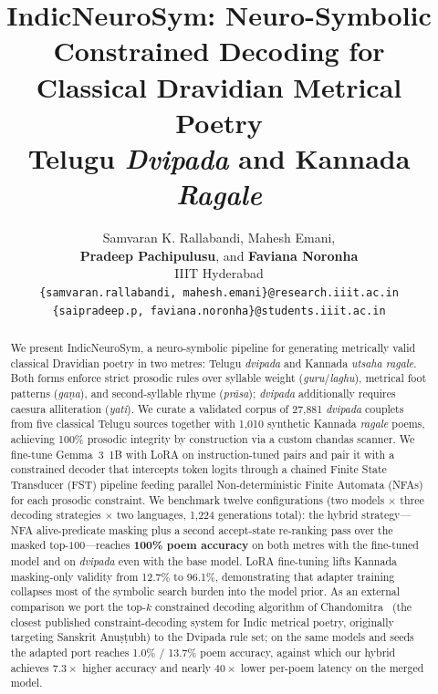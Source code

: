 \documentclass[11pt]{article}
\title{IndicNeuroSym: Neuro-Symbolic Constrained Decoding for\\
       Classical Dravidian Metrical Poetry\\
       \large Telugu \textit{Dvipada} and Kannada \textit{Ragale}}
\author{
  Samvaran K. Rallabandi, Mahesh Emani, \\ 
  {\bf Pradeep Pachipulusu}, and {\bf Faviana Noronha} \\
  IIIT Hyderabad \\
  \texttt{\small \{samvaran.rallabandi, mahesh.emani\}@research.iiit.ac.in} \\
  \texttt{\small \{saipradeep.p, faviana.noronha\}@students.iiit.ac.in} \\
}
\begin{document}
\maketitle

\begin{abstract}
We present IndicNeuroSym, a neuro-symbolic pipeline for generating
metrically valid classical Dravidian poetry in two metres: Telugu
\textit{dvipada} and Kannada \textit{utsaha ragale}. Both forms enforce
strict prosodic rules over syllable weight (\textit{guru}/\textit{laghu}),
metrical foot patterns (\textit{ga\d{n}a}), and second-syllable rhyme
(\textit{pr\={a}sa}); \textit{dvipada} additionally requires caesura
alliteration (\textit{yati}). We curate a validated corpus of 27,881
\textit{dvipada} couplets from five classical Telugu sources together with
1,010 synthetic Kannada \textit{ragale} poems, achieving 100\% prosodic
integrity by construction via a custom chandas scanner. We fine-tune
Gemma~3~1B with LoRA on instruction-tuned pairs and pair it with a
constrained decoder that intercepts token logits through a chained
Finite State Transducer (FST) pipeline feeding parallel Non-deterministic
Finite Automata (NFAs) for each prosodic constraint. We benchmark twelve
configurations (two models $\times$ three decoding strategies $\times$ two
languages, 1{,}224 generations total): the hybrid strategy---NFA
alive-predicate masking plus a second accept-state re-ranking pass over
the masked top-$100$---reaches \textbf{100\% poem accuracy} on both
metres with the fine-tuned model and on \textit{dvipada} even with the
base model.
LoRA fine-tuning lifts Kannada masking-only validity from 12.7\% to
96.1\%, demonstrating that adapter training collapses most of the
symbolic search burden into the model prior. As an external comparison we port the
top-$k$ constrained decoding algorithm of
Chandomitra~\citep{jagadeeshan2026chandomitra} (the closest published
constraint-decoding system for Indic metrical poetry, originally targeting
Sanskrit Anu\d{s}\d{t}ubh) to the Dvipada rule set; on the same models
and seeds the adapted port reaches 1.0\% / 13.7\% poem accuracy, against
which our hybrid achieves $7.3\times$ higher accuracy and nearly
$40\times$ lower per-poem latency on the merged model.
\end{abstract}

\end{document}
